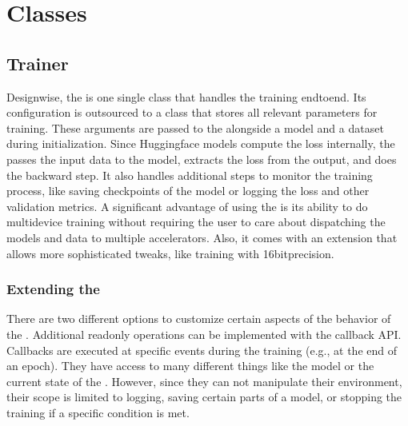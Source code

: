 \documentclass[letterpaper,10pt,english]{jupyterBook}
\begin{document}
\section{Classes}
\label{\detokenize{HuggingFaceTrainer:classes}}

\subsection{Trainer}
\label{\detokenize{HuggingFaceTrainer:trainer}}
\sphinxAtStartPar
Design\sphinxhyphen{}wise, the  is one single class that handles the training end\sphinxhyphen{}to\sphinxhyphen{}end.
Its configuration is outsourced to a  class that stores all relevant parameters for training.
These arguments are passed to the   alongside a model and a dataset during initialization.
Since Huggingface models compute the loss internally, the  passes the input data to the model, extracts the loss from the output, and does the backward step.
It also handles additional steps to monitor the training process, like saving checkpoints of the model or logging the loss and other validation metrics.
A significant advantage of using the  is its ability to do multi\sphinxhyphen{}device training without requiring the user to care about dispatching the models and data to multiple accelerators.
Also, it comes with an extension that allows more sophisticated tweaks, like training with 16bit\sphinxhyphen{}precision.


\subsubsection{Extending the }
\label{\detokenize{HuggingFaceTrainer:extending-the-trainer}}
\sphinxAtStartPar
There are two different options to customize certain aspects of the behavior of the .
Additional read\sphinxhyphen{}only operations can be implemented with the callback API.
Callbacks are executed at specific events during the training (e.g., at the end of an epoch).
They have access to many different things like the model or the current state of the .
However, since they can not manipulate their environment, their scope is limited to logging, saving certain parts of a model, or stopping the training if a specific condition is met.
\end{document}
